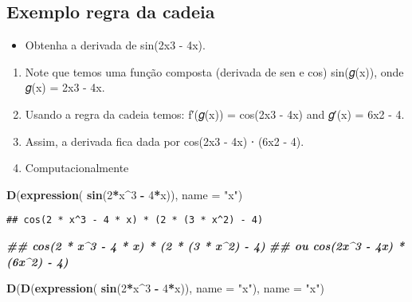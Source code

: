 \documentclass[
]{article}
\newenvironment{Shaded}{\begin{snugshade}}{\end{snugshade}}
\newcommand{\AttributeTok}[1]{\textcolor[rgb]{0.13,0.29,0.53}{#1}}
\newcommand{\DecValTok}[1]{\textcolor[rgb]{0.00,0.00,0.81}{#1}}
\newcommand{\DocumentationTok}[1]{\textcolor[rgb]{0.56,0.35,0.01}{\textbf{\textit{#1}}}}
\newcommand{\FunctionTok}[1]{\textcolor[rgb]{0.13,0.29,0.53}{\textbf{#1}}}
\newcommand{\NormalTok}[1]{#1}
\newcommand{\SpecialCharTok}[1]{\textcolor[rgb]{0.81,0.36,0.00}{\textbf{#1}}}
\newcommand{\StringTok}[1]{\textcolor[rgb]{0.31,0.60,0.02}{#1}}
\providecommand{\tightlist}{%
  \setlength{\itemsep}{0pt}\setlength{\parskip}{0pt}}
\begin{document}
\hypertarget{exemplo-regra-da-cadeia}{%
\subsection{Exemplo regra da cadeia}\label{exemplo-regra-da-cadeia}}

\begin{itemize}
\tightlist
\item
  Obtenha a derivada de sin(2x3 - 4x).
\end{itemize}

\begin{enumerate}
\def\labelenumi{\arabic{enumi}.}
\tightlist
\item
  Note que temos uma função composta (derivada de sen e cos) sin(𝑔(x)),
  onde 𝑔(x) = 2x3 - 4x.
\item
  Usando a regra da cadeia temos: f′(𝑔(x)) = cos(2x3 - 4x) and 𝑔′(x) =
  6x2 - 4.
\item
  Assim, a derivada fica dada por cos(2x3 - 4x) ⋅ (6x2 - 4).
\item
  Computacionalmente
\end{enumerate}

\begin{Shaded}
\begin{Highlighting}[]
\FunctionTok{D}\NormalTok{(}\FunctionTok{expression}\NormalTok{( }\FunctionTok{sin}\NormalTok{(}\DecValTok{2}\SpecialCharTok{*}\NormalTok{x}\SpecialCharTok{\^{}}\DecValTok{3} \SpecialCharTok{{-}} \DecValTok{4}\SpecialCharTok{*}\NormalTok{x)), }\AttributeTok{name =} \StringTok{"x"}\NormalTok{)}
\end{Highlighting}
\end{Shaded}

\begin{verbatim}
## cos(2 * x^3 - 4 * x) * (2 * (3 * x^2) - 4)
\end{verbatim}

\begin{Shaded}
\begin{Highlighting}[]
\DocumentationTok{\#\# cos(2 * x\^{}3 {-} 4 * x) * (2 * (3 * x\^{}2) {-} 4)}
\DocumentationTok{\#\# ou cos(2x\^{}3 {-} 4x) * (6x\^{}2) {-} 4)}

\FunctionTok{D}\NormalTok{(}\FunctionTok{D}\NormalTok{(}\FunctionTok{expression}\NormalTok{( }\FunctionTok{sin}\NormalTok{(}\DecValTok{2}\SpecialCharTok{*}\NormalTok{x}\SpecialCharTok{\^{}}\DecValTok{3} \SpecialCharTok{{-}} \DecValTok{4}\SpecialCharTok{*}\NormalTok{x)), }\AttributeTok{name =} \StringTok{"x"}\NormalTok{), }\AttributeTok{name =} \StringTok{"x"}\NormalTok{)}
\end{Highlighting}
\end{Shaded}
\end{document}
